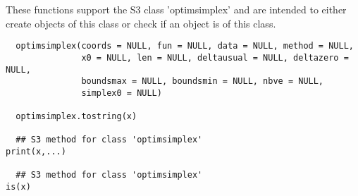 %
\begin{Description}\relax
These functions support the S3 class 'optimsimplex' and are intended to either 
create objects of this class or check if an object is of this class.
\end{Description}
%
\begin{Usage}
\begin{verbatim}
  optimsimplex(coords = NULL, fun = NULL, data = NULL, method = NULL,
               x0 = NULL, len = NULL, deltausual = NULL, deltazero = NULL,
               boundsmax = NULL, boundsmin = NULL, nbve = NULL,
               simplex0 = NULL)
  
  optimsimplex.tostring(x)
  
  ## S3 method for class 'optimsimplex'
print(x,...)
  
  ## S3 method for class 'optimsimplex'
is(x)
  
\end{verbatim}
\end{Usage}
%
